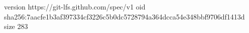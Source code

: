 version https://git-lfs.github.com/spec/v1
oid sha256:7aacfe1b3af397334cf3226c5b0dc5728794a364dcca54e348bbf9706df1413d
size 283
